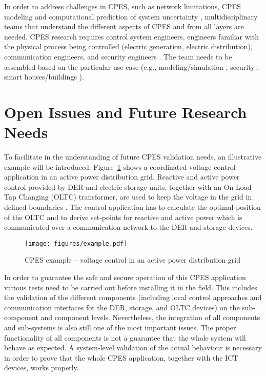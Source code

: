 \documentclass[runningheads,a4paper]{llncs}
\begin{document}
In order to address challenges in CPES, such as network limitations, CPES modeling and computational prediction of system uncertainty \cite{macana2011}, multidisciplinary teams that understand the different aspects of CPES and from all layers are needed. CPES research requires control system engineers, engineers familiar with the physical process being controlled (electric generation, electric distribution), communication engineers, and security engineers \cite{morris2009}. The team needs to be assembled based on the particular use case (e.g., modeling/simulation \cite{al2014,ilic2008m,palensky2014}, security \cite{khan2013,sridhar2012}, smart houses/buildings \cite{kleissl2010,wu2011}).  
%
%
\section{Open Issues and Future Research Needs}
\label{sec:future_research_needs}

To facilitate in the understanding of future CPES validation needs, an illustrative example will be introduced. Figure~\ref{fig:example} shows a coordinated voltage control application in an active power distribution grid. Reactive and active power control provided by DER and electric storage units, together with an On-Load Tap Changing (OLTC) transformer, are used to keep the voltage in the grid in defined boundaries \cite{Stifter:2011}. The control application has to calculate the optimal position of the OLTC and to derive set-points for reactive and active power which is communicated over a communication network to the DER and storage devices.  

\begin{figure}[!htbp]
	\centering
	\texttt{[image: figures/example.pdf]}
	\caption{CPES example -- voltage control in an active power distribution grid}
	\label{fig:example}
\end{figure}

In order to guarantee the safe and secure operation of this CPES application various tests need to be carried out before installing it in the field. This includes the validation of the different components (including local control approaches and communication interfaces for the DER, storage, and OLTC devices) on the sub-component and component levels. Nevertheless, the integration of all components and sub-systems is also still one of the most important issues. The proper functionality of all components is not a guarantee that the whole system will behave as expected. A system-level validation of the actual behaviour is necessary in order to prove that the whole CPES application, together with the ICT devices, works properly. 
\end{document}
